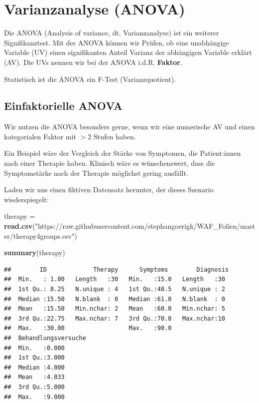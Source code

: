 \documentclass[
]{book}
\newenvironment{Shaded}{\begin{snugshade}}{\end{snugshade}}
\newcommand{\FunctionTok}[1]{\textcolor[rgb]{0.13,0.29,0.53}{\textbf{#1}}}
\newcommand{\NormalTok}[1]{#1}
\newcommand{\OtherTok}[1]{\textcolor[rgb]{0.56,0.35,0.01}{#1}}
\newcommand{\StringTok}[1]{\textcolor[rgb]{0.31,0.60,0.02}{#1}}
\begin{document}
\chapter{Varianzanalyse (ANOVA)}\label{varianzanalyse-anova}

Die ANOVA (Analysis of variance, dt. Varianzanalyse) ist ein weiterer Signifikanztest. Mit der ANOVA können wir Prüfen, ob eine unabhängige Variable (UV) einen signifikanten Anteil Varianz der abhängigen Variable erklärt (AV). Die UVs nennen wir bei der ANOVA i.d.R. \textbf{Faktor}.

Statistisch ist die ANOVA ein F-Test (Varianzquotient).

\section{Einfaktorielle ANOVA}\label{einfaktorielle-anova}

Wir nutzen die ANOVA besonders gerne, wenn wir eine numerische AV und einen kategorialen Faktor mit \(>2\) Stufen haben.

Ein Beispiel wäre der Vergleich der Stärke von Symptomen, die Patient:innen nach einer Therapie haben. Klinisch wäre es wünschenswert, dass die Symptomstärke nach der Therapie möglichst gering ausfällt.

Laden wir uns einen fiktiven Datensatz herunter, der dieses Szenario wiederspiegelt:

\begin{Shaded}
\begin{Highlighting}[]
\NormalTok{therapy }\OtherTok{=} \FunctionTok{read.csv}\NormalTok{(}\StringTok{"https://raw.githubusercontent.com/stephangoerigk/WAF\_Folien/master/therapy4groups.csv"}\NormalTok{)}

\FunctionTok{summary}\NormalTok{(therapy)}
\end{Highlighting}
\end{Shaded}

\begin{verbatim}
##        ID             Therapy      Symptoms        Diagnosis 
##  Min.   : 1.00   Length   :30   Min.   :15.0   Length   :30  
##  1st Qu.: 8.25   N.unique : 4   1st Qu.:48.5   N.unique : 2  
##  Median :15.50   N.blank  : 0   Median :61.0   N.blank  : 0  
##  Mean   :15.50   Min.nchar: 2   Mean   :60.0   Min.nchar: 5  
##  3rd Qu.:22.75   Max.nchar: 7   3rd Qu.:70.0   Max.nchar:10  
##  Max.   :30.00                  Max.   :90.0                 
##  Behandlungsversuche
##  Min.   :0.000      
##  1st Qu.:3.000      
##  Median :4.000      
##  Mean   :4.033      
##  3rd Qu.:5.000      
##  Max.   :9.000
\end{verbatim}
\end{document}
